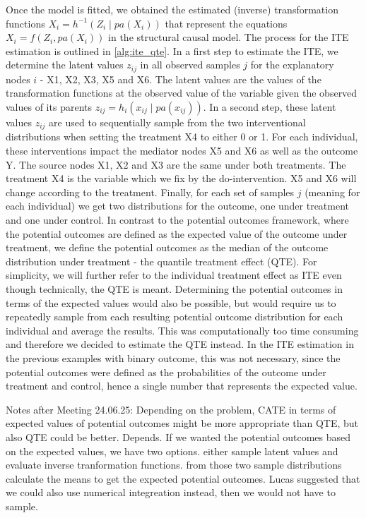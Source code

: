 Once the model is fitted, we obtained the estimated (inverse) transformation functions $X_i = h^{-1}(Z_i \mid pa(X_i))$ that represent the equations $X_i = f(Z_i, pa(X_i))$ in the structural causal model. The process for the ITE estimation is outlined in \ref{alg:ite_qte}. In a first step to estimate the ITE, we determine the latent values $z_{ij}$ in all observed samples $j$ for the explanatory nodes $i$ - X1, X2, X3, X5 and X6. The latent values are the values of the transformation functions at the observed value of the variable given the observed values of its parents $z_{ij} = h_i(x_{ij} \mid pa(x_{ij}))$. In a second step, these latent values $z_{ij}$ are used to sequentially sample from the two interventional distributions when setting the treatment X4 to either 0 or 1. For each individual, these interventions impact the mediator nodes X5 and X6 as well as the outcome Y. The source nodes X1, X2 and X3 are the same under both treatments. The treatment X4 is the variable which we fix by the do-intervention. X5 and X6 will change according to the treatment. Finally, for each set of samples $j$ (meaning for each individual) we get two distributions for the outcome, one under treatment and one under control. In contrast to the potential outcomes framework, where the potential outcomes are defined as the expected value of the outcome under treatment, we define the potential outcomes as the median of the outcome distribution under treatment - the quantile treatment effect (QTE). For simplicity, we will further refer to the individual treatment effect as ITE even though technically, the QTE is meant. Determining the potential outcomes in terms of the expected values would also be possible, but would require us to repeatedly sample from each resulting potential outcome distribution for each individual and average the results. This was computationally too time consuming and therefore we decided to estimate the QTE instead. In the ITE estimation in the previous examples with binary outcome, this was not necessary, since the potential outcomes were defined as the probabilities of the outcome under treatment and control, hence a single number that represents the expected value.

Notes after Meeting 24.06.25: Depending on the problem, CATE in terms of expected values of potential outcomes might be more appropriate than QTE, but also QTE could be better. Depends. If we wanted the potential outcomes based on the expected values, we have two options. either sample latent values and evaluate inverse tranformation functions. from those two sample distributions calculate the means to get the expected potential outcomes. Lucas suggested that we could also use numerical integreation instead, then we would not have to sample.


